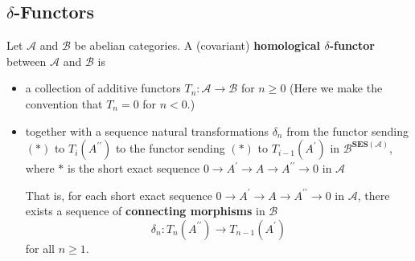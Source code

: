 \documentclass[12pt, oneside]{book}
\begin{document}
\subsection{$\delta$-Functors}
\begin{definition}
    Let $\mathcal{A}$ and $\mathcal{B}$ be abelian categories.
    A (covariant) \textbf{homological $\delta$-functor} between $\mathcal{A}$ and $\mathcal{B}$ is
    \begin{itemize}
        \item
              a collection of additive functors $T_n: \mathcal{A} \rightarrow \mathcal{B}$ for $n \geq 0$
              (Here we make the convention that $T_n=0$ for $n<0$.)
        \item
              together with a sequence natural transformations $\delta_n$ from the functor sending $(*)$ to $T_i(A^{\prime\prime})$ to the functor sending $(*)$ to $T_{i-1}(A^\prime)$ in $\mathcal{B}^{\mathbf{SES}\left(\mathcal{A}\right)}$, where $*$ is the short exact sequence $0 \rightarrow A^\prime \rightarrow A \rightarrow A^{\prime\prime} \rightarrow 0$ in $\mathcal{A}$

              \begin{remark}
                  That is, for each short exact sequence $0 \rightarrow A^\prime \rightarrow A \rightarrow A^{\prime\prime} \rightarrow 0$ in $\mathcal{A}$, there exists a sequence of \textbf{connecting morphisms} in $\mathcal{B}$
                  \begin{equation*}
                      \delta_n: T_n(A^{\prime\prime}) \rightarrow T_{n-1}(A^\prime)\tag{*}
                  \end{equation*}
                  for all $n \geq 1$.


\end{remark}
\end{itemize}
\end{definition}
\end{document}
